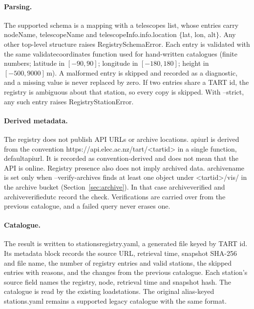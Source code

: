 \documentclass[11pt,a4paper]{article}
\newcommand{\code}[1]{{\ttfamily\def\_{\textunderscore\allowbreak}#1}}
\begin{document}
\paragraph{Parsing.} The supported schema is a mapping with a
\code{telescopes} list, whose entries carry \code{nodeName},
\code{telescopeName} and \code{telescopeInfo.info.location}
$\{$\code{lat}, \code{lon}, \code{alt}$\}$. Any other top-level structure raises
\code{RegistrySchemaError}. Each entry is validated with the same
\code{validate\_coordinates} function used for hand-written catalogues
(finite numbers; latitude in $[-90,90]$; longitude in $[-180,180]$; height
in $[-500,9000]$\,m). A malformed entry is skipped and recorded as a
diagnostic, and a missing value is never replaced by zero. If two entries
share a TART id, the registry is ambiguous about that station, so every
copy is skipped. With \code{--strict}, any such entry raises
\code{RegistryStationError}.

\paragraph{Derived metadata.} The registry does not publish API URLs or
archive locations. \code{api\_url} is derived from the convention
\code{https://api.elec.ac.nz/tart/<tart\_id>} in a single function,
\code{default\_api\_url}. It is recorded as convention-derived and does not
mean that the API is online. Registry presence also does not imply archived
data. \code{archive\_name} is set only when \code{--verify-archives} finds
at least one object under \code{<tart\_id>/vis/} in the archive bucket
(Section~\ref{sec:archive}). In that case \code{archive\_verified} and
\code{archive\_verified\_utc} record the check. Verifications are carried
over from the previous catalogue, and a failed query never erases one.

\paragraph{Catalogue.} The result is written to
\code{stations\_registry.yaml}, a generated file keyed by TART id. Its
\code{metadata} block records the source URL, retrieval time, snapshot
SHA-256 and file name, the number of registry entries and valid stations,
the skipped entries with reasons, and the changes from the previous
catalogue. Each station's \code{source} field names the registry, node,
retrieval time and snapshot hash. The catalogue is read by the existing
\code{load\_stations}. The original alias-keyed \code{stations.yaml} remains
a supported legacy catalogue with the same format.
\end{document}
